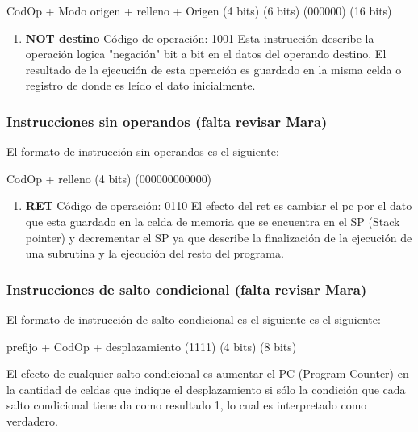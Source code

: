   CodOp   +  Modo origen  +  relleno  +  Origen
(4 bits)      (6 bits)      (000000)    (16 bits)

\begin{enumerate}
\item \textbf{NOT destino}
Código de operación: 1001
Esta instrucción describe la operación logica "negación" bit a bit en el datos del operando destino. El resultado de la ejecución de esta operación es guardado en la misma celda o registro de donde es leído el dato inicialmente.
\end{enumerate}

\subsubsection{Instrucciones sin operandos  (falta revisar Mara)}

El formato de instrucción sin operandos es el siguiente:

 CodOp     +    relleno 
(4 bits)     (000000000000)


\begin{enumerate}
\item \textbf{RET}
Código de operación: 0110
El efecto del ret es cambiar el pc por el dato que esta guardado en la celda de memoria que se encuentra en el SP (Stack pointer) y decrementar el SP ya que describe la finalización de la ejecución de una subrutina y la ejecución del resto del programa.
\end{enumerate}


\subsubsection{Instrucciones de salto condicional  (falta revisar Mara)}

El formato de instrucción de salto condicional es el siguiente es el siguiente:

 prefijo +   CodOp   +  desplazamiento 
 (1111)     (4 bits)     (8 bits)

El efecto de cualquier salto condicional es aumentar el PC (Program Counter) en la cantidad de celdas que indique el desplazamiento si sólo la condición que cada salto condicional tiene da como resultado 1, lo cual es interpretado como verdadero.

